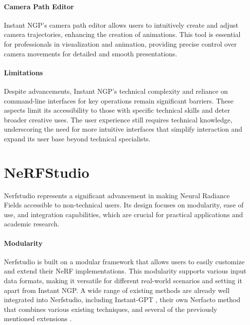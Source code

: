 \paragraph{Camera Path Editor}
Instant NGP's camera path editor allows users to intuitively create and adjust camera trajectories, enhancing the creation of animations.
This tool is essential for professionals in visualization and animation, providing precise control over camera movements for detailed and smooth presentations.

\paragraph{Limitations}
Despite advancements, Instant NGP's technical complexity and reliance on command-line interfaces for key operations remain significant barriers.
These aspects limit its accessibility to those with specific technical skills and deter broader creative uses.
The user experience still requires technical knowledge, underscoring the need for more intuitive interfaces that simplify interaction and expand its user base beyond technical specialists.

\section{NeRFStudio}
\label{sec:related:nerfstudio}

Nerfstudio \cite{tancik_nerfstudio_2023} represents a significant advancement in making Neural Radiance Fields accessible to non-technical users.
Its design focuses on modularity, ease of use, and integration capabilities, which are crucial for practical applications and academic research.

\paragraph{Modularity}
Nerfstudio is built on a modular framework that allows users to easily customize and extend their NeRF implementations.
This modularity supports various input data formats, making it versatile for different real-world scenarios and setting it apart from Instant NGP.
A wide range of existing methods are already well integrated into Nerfstudio, including Instant-GPT \cite{muller_instant_2022}, their own Nerfacto \cite{noauthor_nerfacto_nodate} method that combines various existing techniques, and several of the previously mentioned extensions \cite{haque_instruct-nerf2nerf_2023,jan-niklas_dihlmann_signerf_2024}.

